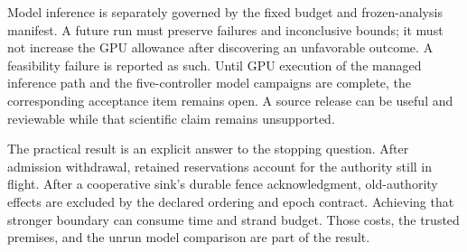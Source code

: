 Model inference is separately governed by the fixed budget and frozen-analysis
manifest. A future run must preserve failures and inconclusive bounds; it must
not increase the GPU allowance after discovering an unfavorable outcome. A
feasibility failure is reported as such. Until GPU execution of the managed inference path and
the five-controller model campaigns are complete, the corresponding acceptance
item remains open. A source release can be useful and reviewable while that
scientific claim remains unsupported.

The practical result is an explicit answer to the stopping question. After
admission withdrawal, retained reservations account for the authority still in
flight. After a cooperative sink's durable fence acknowledgment, old-authority
effects are excluded by the declared ordering and epoch contract. Achieving that
stronger boundary can consume time and strand budget. Those costs, the trusted
premises, and the unrun model comparison are part of the result.
